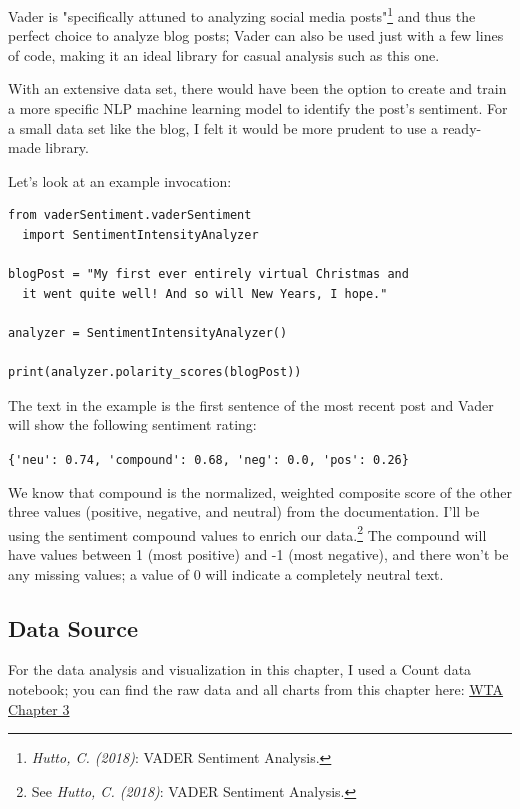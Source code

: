 Vader is "specifically attuned to analyzing social media posts"\footnote{\textit{Hutto, C. (2018)}: VADER Sentiment Analysis.\cite{vaderReadme}} and thus the perfect choice to analyze blog posts; Vader can also be used just with a few lines of code, making it an ideal library for casual analysis such as this one. 

With an extensive data set, there would have been the option to create and train a more specific NLP machine learning model to identify the post's sentiment. For a small data set like the blog, I felt it would be more prudent to use a ready-made library.

Let's look at an example invocation:

\begin{lstlisting}[caption=Vader Example, frame=single, basicstyle=\ttfamily]
from vaderSentiment.vaderSentiment 
  import SentimentIntensityAnalyzer

blogPost = "My first ever entirely virtual Christmas and 
  it went quite well! And so will New Years, I hope."

analyzer = SentimentIntensityAnalyzer()

print(analyzer.polarity_scores(blogPost))

\end{lstlisting}

The text in the example is the first sentence of the most recent post and Vader will show the following sentiment rating:

\verb|{'neu': 0.74, 'compound': 0.68, 'neg': 0.0, 'pos': 0.26}|

We know that compound is the normalized, weighted composite score of the other three values (positive, negative, and neutral) from the documentation. I'll be using the sentiment compound values to enrich our data.\footnote{See \textit{Hutto, C. (2018)}: VADER Sentiment Analysis.\cite{vaderReadme}} The compound will have values between 1 (most positive) and -1 (most negative), and there won't be any missing values; a value of 0 will indicate a completely neutral text.

\subsection{Data Source}

For the data analysis and visualization in this chapter, I used a Count data notebook; you can find the raw data and all charts from this chapter here: \href{https://count.co/n/6WKuBzDV4Qq}{WTA Chapter 3}
